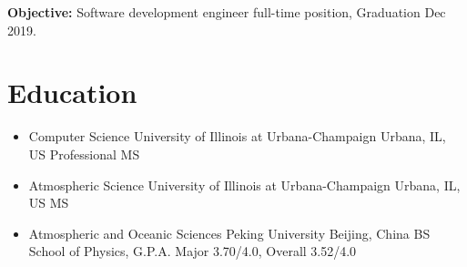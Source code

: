 \documentclass[11pt,a4paper,sans]{moderncv}        %
\begin{document}
\makecvtitle

\vspace{-40pt}
\begin{center}
	\textbf{Objective:} Software development engineer full-time position, Graduation Dec 2019.
\end{center}
\vspace{-20pt}
\section{Education}
\vspace{-5pt}
\begin{itemize}
	\item {
	      {Computer Science}
	      {University of Illinois at Urbana-Champaign}
	      {Urbana, IL, US}
	      {Professional MS}
	      {}
	      }
	      
	\item {
	      {Atmospheric Science}
	      {University of Illinois at Urbana-Champaign}
	      {Urbana, IL, US}
	      {MS}
	      {}
	      }
	      
	\item {
	      {Atmospheric and Oceanic Sciences}
	      {Peking University}
	      {Beijing, China}
	      {BS}
	      {School of Physics, G.P.A. Major 3.70/4.0, Overall 3.52/4.0}
	      }
\end{itemize}

\vspace{-5pt}
\end{document}
